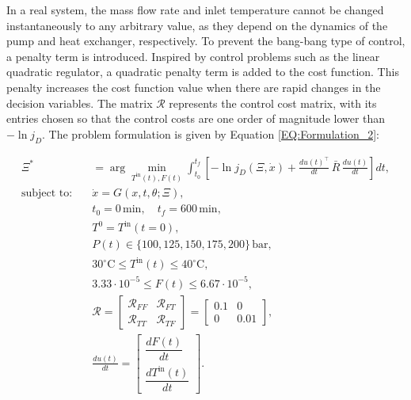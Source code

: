 \documentclass[a4paper,fleqn]{cas-dc}
\begin{document}
		In a real system, the mass flow rate and inlet temperature cannot be changed instantaneously to any arbitrary value, as they depend on the dynamics of the pump and heat exchanger, respectively. To prevent the bang-bang type of control, a penalty term is introduced. Inspired by control problems such as the linear quadratic regulator, a quadratic penalty term is added to the cost function. This penalty increases the cost function value when there are rapid changes in the decision variables. The matrix $\mathcal{R}$ represents the control cost matrix, with its entries chosen so that the control costs are one order of magnitude lower than $-\ln j_D$. The problem formulation is given by Equation \ref{EQ:Formulation_2}:
		
		{\footnotesize 
			\begin{equation}
				\begin{aligned}
					\Xi^* &= \arg \min_{T^{\text{in}}(t), F(t)} 
					\int_{t_0}^{t_f} \left[ - \ln j_D(\Xi, \dot{x}) + 
					\frac{du(t)^\top}{dt} \, \bar{R} \, \frac{du(t)}{dt} \right] dt, \\
					\text{subject to:} \quad 
					& \dot{x} = G(x, t, \theta; \Xi), \\
					& t_0 = 0 \, \text{min}, \quad t_f = 600 \, \text{min}, \\
					& T^0 = T^{\text{in}}(t=0), \\
					& P(t) \in \{100, 125, 150, 175, 200\} \, \text{bar}, \\
					& 30^\circ\text{C} \leq T^{\text{in}}(t) \leq 40^\circ\text{C}, \\
					& 3.33 \cdot 10^{-5} \leq F(t) \leq 6.67 \cdot 10^{-5}, \\
					& \mathcal{R} = 
					\begin{bmatrix} 
						\mathcal{R}_{FF} & \mathcal{R}_{FT} \\ 
						\mathcal{R}_{TT} & \mathcal{R}_{TF} 
					\end{bmatrix}=
					\begin{bmatrix} 
						0.1 & 0 \\ 
						0 & 0.01 
					\end{bmatrix}, \\
					& \frac{du(t)}{dt} = 
					\begin{bmatrix} 
						\dfrac{dF(t)}{dt} \\ 
						\dfrac{dT^{\text{in}}(t)}{dt} 
					\end{bmatrix}.
				\end{aligned}
				\label{EQ:Formulation_2}
		\end{equation} }
		
\end{document}
